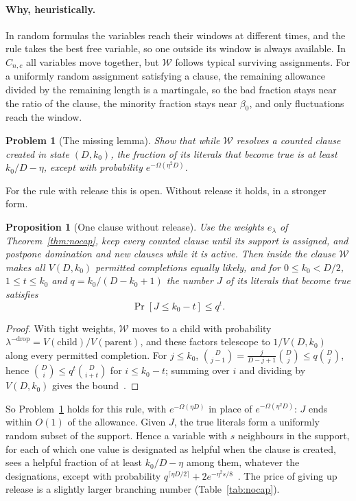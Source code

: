 \documentclass[11pt,a4paper]{article}
\newtheorem{proposition}[theorem]{Proposition}
\newtheorem{problem}[theorem]{Problem}
\theoremstyle{remark}
\newcommand{\W}{\mathcal{W}}
\begin{document}
\paragraph{Why, heuristically.} In random formulas the variables reach their
windows at different times, and the rule takes the best free variable, so one
outside its window is always available. In $C_{n,c}$ all variables move
together, but $\W$ follows typical surviving assignments. For a uniformly
random assignment satisfying a clause, the remaining allowance divided by the
remaining length is a martingale, so the bad fraction stays near the ratio of
the clause, the minority fraction stays near $\beta_0$, and only fluctuations
reach the window.

\begin{problem}[The missing lemma]\label{prob:phase}
Show that while $\W$ resolves a counted clause created in state $(D,k_0)$, the
fraction of its literals that become true is at least $k_0/D-\eta$, except with
probability $e^{-\Omega(\eta^2D)}$.
\end{problem}

For the rule with release this is open. Without release it holds, in a
stronger form.

\begin{proposition}[One clause without release]\label{prop:phase}
Use the weights $e_\lambda$ of Theorem~\ref{thm:nocap}, keep every counted
clause until its support is assigned, and postpone domination and new clauses
while it is active. Then inside the clause $\W$ makes all $V(D,k_0)$ permitted
completions equally likely, and for $0\le k_0<D/2$, $1\le t\le k_0$ and
$q=k_0/(D-k_0+1)$ the number $J$ of its literals that become true satisfies
\[
 \Pr[J\le k_0-t]\le q^t .
\]
\end{proposition}

\begin{proof}
With tight weights, $\W$ moves to a child with probability
$\lambda^{-\text{drop}}=V(\text{child})/V(\text{parent})$, and these factors
telescope to $1/V(D,k_0)$ along every permitted completion. For $j\le k_0$,
$\binom D{j-1}=\frac j{D-j+1}\binom Dj\le q\binom Dj$, hence
$\binom Di\le q^t\binom D{i+t}$ for $i\le k_0-t$; summing over $i$ and dividing
by $V(D,k_0)$ gives the bound~\cite{N5}.
\end{proof}

So Problem~\ref{prob:phase} holds for this rule, with $e^{-\Omega(\eta D)}$ in
place of $e^{-\Omega(\eta^2D)}$: $J$ ends within $O(1)$ of the allowance. Given
$J$, the true literals form a uniformly random subset of the support. Hence a
variable with $s$ neighbours in the support, for each of which one value is
designated as helpful when the clause is created, sees a helpful fraction of at
least $k_0/D-\eta$ among them, whatever the designations, except with
probability $q^{\lceil\eta D/2\rceil}+2e^{-\eta^2s/8}$~\cite{N5}. The price of
giving up release is a slightly larger branching number (Table~\ref{tab:nocap}).
\end{document}
